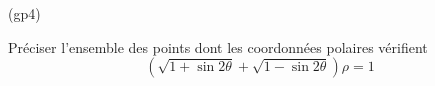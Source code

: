 \begin{tiny}(gp4)\end{tiny}
Pr{\'e}ciser l'ensemble des points dont les coordonn{\'e}es polaires
v{\'e}rifient
\[ \left(\sqrt{1+\sin 2\theta}+\sqrt{1-\sin 2\theta}\right) \rho =1\]